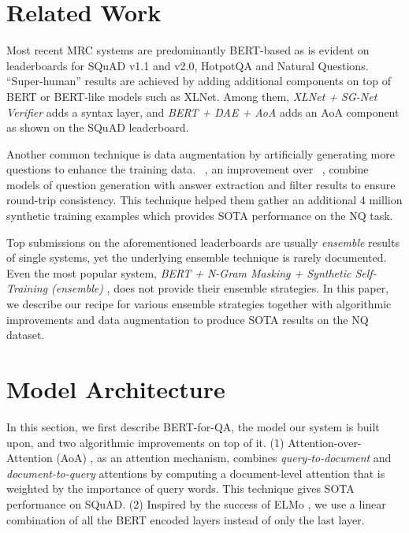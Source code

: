 \documentclass[letterpaper]{article} \usepackage{aaai20}  \usepackage{times}  \usepackage{helvet} \usepackage{courier}  \usepackage[hyphens]{url}  \usepackage{graphicx} \urlstyle{rm} \def\UrlFont{\rm}  \usepackage{graphicx}  \frenchspacing  \setlength{\pdfpagewidth}{8.5in}  \setlength{\pdfpageheight}{11in}  \usepackage{amsmath}
\newcommand{\bertqa}{{\sc BERT-for-QA}}
\newcommand{\citet}[1]{\citeauthor{#1}~\shortcite{#1}}
\begin{document}
%
 \section{Related Work}
\label{sec:relatedwork}




Most recent MRC systems are predominantly BERT-based as is evident on leaderboards for SQuAD v1.1 and v2.0, HotpotQA and Natural Questions. ``Super-human'' results are achieved by adding additional components on top of BERT or BERT-like models such as XLNet. Among them, \textit{XLNet + SG-Net Verifier} \cite{zhang2019sg} adds a syntax layer, and \textit{BERT + DAE + AoA} adds an AoA component as shown on the SQuAD leaderboard.

Another common technique is data augmentation by artificially generating more questions to enhance the training data. \citet{albert-synth-data}, an improvement over \citet{alberti2019bert}, combine models of question generation with answer extraction and filter results to ensure round-trip consistency. This technique helped them gather an additional 4 million synthetic training examples which provides SOTA performance on the NQ task. 

Top submissions on the aforementioned leaderboards are usually \textit{ensemble} results of single systems, yet the underlying ensemble technique is rarely documented. Even the most popular system, \textit{BERT + N-Gram Masking + Synthetic Self-Training (ensemble)} \cite{Devlin2018BERTPO}, does not provide their ensemble strategies. In this paper, we describe our recipe for various ensemble strategies together with algorithmic improvements and data augmentation to produce SOTA results on the NQ dataset.






%
 \section{Model Architecture}
\label{sec:model-arch}

In this section, we first describe \bertqa, the model our system is built upon, and two algorithmic improvements on top of it. (1) Attention-over-Attention (AoA) \cite{cui_2017}, as an attention mechanism, combines \emph{query-to-document} and \emph{document-to-query} attentions by computing a document-level attention that is weighted by the importance of query words. This technique gives SOTA performance on SQuAD. (2) Inspired by the success of ELMo \cite{Peters_2018}, we use a linear combination of all the BERT encoded layers instead of only the last layer.
\end{document}
